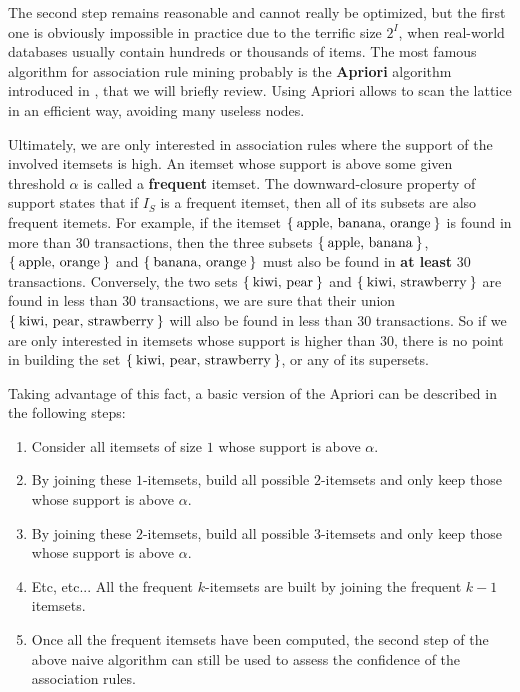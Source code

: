 The second step remains reasonable and cannot really be optimized, but the
first one is obviously impossible in practice due to the terrific size $2^I$,
when real-world databases usually contain hundreds or thousands of items.
The most famous algorithm for association rule mining probably is the
\textbf{Apriori} algorithm introduced in \cite{AgrSriVLDB94}, that we will
briefly review. Using Apriori allows to scan the lattice in an efficient way,
avoiding many useless nodes.

Ultimately, we are only interested in association rules where the support of
the involved itemsets is high. An itemset whose support is above some given
threshold $\alpha$ is called a \textbf{frequent} itemset. The downward-closure
property of support states that if $I_S$ is a frequent itemset, then all of its
subsets are also frequent itemets. For example, if the itemset
$\Set{\text{apple, banana, orange}}$ is found in more than 30 transactions,
then the three subsets $\Set{\text{apple, banana}}$, $\Set{\text{apple,
orange}}$ and $\Set{\text{banana, orange}}$ must also be found in \textbf{at
least} 30 transactions. Conversely, the two sets $\Set{\text{kiwi, pear}}$ and
$\Set{\text{kiwi, strawberry}}$ are found in less than $30$ transactions, we
are sure that their union $\Set{\text{kiwi, pear, strawberry}}$ will also be
found in less than $30$ transactions. So if we are only interested in itemsets
whose support is higher than $30$, there is no point in building the set
$\Set{\text{kiwi, pear, strawberry}}$, or any of its supersets.

Taking advantage of this fact, a basic version of the Apriori can be described
in the following steps:
\begin{enumerate}
  \item Consider all itemsets of size $1$ whose support is above $\alpha$.
  \item By joining these $1$-itemsets, build all possible $2$-itemsets and only
    keep those whose support is above $\alpha$.
  \item By joining these $2$-itemsets, build all possible $3$-itemsets and only
    keep those whose support is above $\alpha$.
  \item Etc, etc... All the frequent $k$-itemsets are built by joining the
    frequent $k-1$ itemsets.
  \item Once all the frequent itemsets have been computed, the second step of
    the above naive algorithm can still be used to assess the confidence of the
    association rules.
\end{enumerate}

